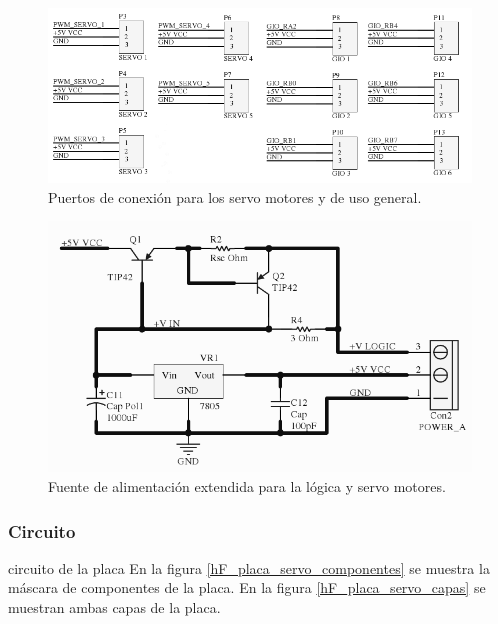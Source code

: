 \begin{figure}
	\centering
	\includegraphics[scale=.35]{figuras/servo_schemaPort.png}
	\caption{Puertos de conexi\'on para los servo motores y de uso general.}
	\label{hF_placa_servo_schema3}
\end{figure}

\begin{figure}
	\centering
	\includegraphics[scale=.3]{figuras/servo_schemaFuente.png}
	\caption{Fuente de alimentaci\'on extendida para la l\'ogica y servo motores.}
	\label{hF_placa_servo_schema4}
\end{figure}

\subsubsection{Circuito}
\label{h_placas_servos_circuito}

circuito de la placa
En la figura \ref{hF_placa_servo_componentes} se muestra la m\'ascara de componentes de la placa.
En la figura \ref{hF_placa_servo_capas} se muestran ambas capas de la placa.

